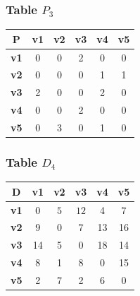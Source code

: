 \documentclass{beamer}
\begin{document}
\begin{frame}
\frametitle{Table $P_{3}$}
\begin{center}
    \begin{tabular}{|c||c|c|c|c|c|}
        \hline
        \textbf{P} & \textbf{v1} & \textbf{v2} & \textbf{v3} & \textbf{v4} & \textbf{v5} \\
        \hline
        \hline
        \textbf{v1}& 0 & 0 & 2 & 0 & 0 \\
        \hline
        \textbf{v2}& 0 & 0 & 0 & 1 & 1 \\
        \hline
        \textbf{v3}& 2 & 0 & 0 & 2 & 0 \\
        \hline
        \textbf{v4}& 0 & 0 & 2 & 0 & 0 \\
        \hline
        \textbf{v5}& 0 & \cellcolor[HTML]{D74894}$3$ & 0 & 1 & 0 \\
        \hline
    \end{tabular}
\end{center}


\end{frame}





\begin{frame}
\frametitle{Table $D_{4}$}
\begin{center}
    \begin{tabular}{|c||c|c|c|c|c|}
        \hline
        \textbf{D} & \textbf{v1} & \textbf{v2} & \textbf{v3} & \textbf{v4} & \textbf{v5} \\
        \hline
        \hline
        \textbf{v1}& 0 & \cellcolor[HTML]{D74894}$5$ & \cellcolor[HTML]{D74894}$12$ & 4 & 7 \\
        \hline
        \textbf{v2}& 9 & 0 & 7 & 13 & 16 \\
        \hline
        \textbf{v3}& 14 & 5 & 0 & 18 & 14 \\
        \hline
        \textbf{v4}& 8 & 1 & 8 & 0 & 15 \\
        \hline
        \textbf{v5}& 2 & 7 & 2 & 6 & 0 \\
        \hline
    \end{tabular}
\end{center}


\end{frame}
\end{document}
